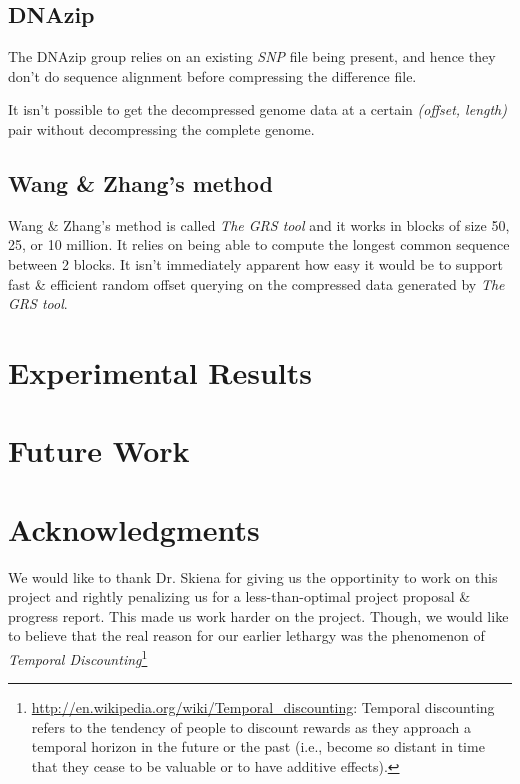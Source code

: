 \documentclass[11pt]{article}
\begin{document}
\subsection{DNAzip}

The DNAzip group relies on an existing \textit{SNP} file being
present, and hence they don't do sequence alignment before compressing
the difference file.

It isn't possible to get the decompressed genome data at a certain
\textit{(offset, length)} pair without decompressing the complete
genome.

\subsection{Wang \& Zhang's method}

Wang \& Zhang's method is called \textit{The GRS tool} and it works in
blocks of size 50, 25, or 10 million. It relies on being able to
compute the longest common sequence between 2 blocks. It isn't
immediately apparent how easy it would be to support fast \& efficient
random offset querying on the compressed data generated by \textit{The
  GRS tool}.

\section{Experimental Results}

\section{Future Work}

\section{Acknowledgments}

We would like to thank Dr. Skiena for giving us the opportinity to
work on this project and rightly penalizing us for a less-than-optimal
project proposal \& progress report. This made us work harder on the
project. Though, we would like to believe that the real reason for our
earlier lethargy was the phenomenon of \textit{Temporal
  Discounting}\footnote{\url{http://en.wikipedia.org/wiki/Temporal_discounting}:
  Temporal discounting refers to the tendency of people to discount
  rewards as they approach a temporal horizon in the future or the
  past (i.e., become so distant in time that they cease to be valuable
  or to have additive effects).}
\end{document}
